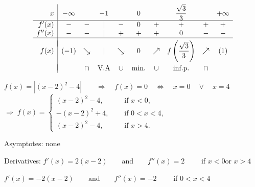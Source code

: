 \begin{Answer}
    		 \[ \begin{array}{r|ccccccccc}
                x & -\infty & & -1 & & 0 & & \dfrac{\sqrt{3}}{3} &  & +\infty \\
                \hline
                f'(x)   & - & - & | & - & 0 & + & + & + & + \\
                f''(x)  & - & - & | & + & + & + & 0 & - & -\\
                \hline
                &&&&&\vspace{-0.3cm}\\
                f(x)    & (-1) & \searrow & | & \searrow & 0 & \nearrow & f\left(\dfrac{\sqrt{3}}{3} \right) & \nearrow & (1)\\
                &&&&&\vspace{-0.3cm}\\                                                                              
                        & & \cap  & \mbox{V.A} & \cup & \mbox{min.} & \cup & \mbox{inf.p.} & \cap \\
                \end{array}\]
    		
    	\Question $f(x) = \left| (x-2)^2-4 \right| 
    		\qquad \Rightarrow \quad  f(x)=0 \quad \Leftrightarrow \quad x=0 \quad \vee \quad x=4$ \\[0.2cm]
    		$\Rightarrow \; f(x)= \left\{ \begin{array}{ll} (x-2)^2-4, & \quad \text{ if }  x <0, \\
    		-(x-2)^2+4, & \quad \text{ if } 0 < x < 4,\\
    		(x-2)^2-4, & \quad \text{ if }  x > 4. \end{array} \right.$ \\[0.2cm]
    		\item [] Asymptotes: \quad none\par
    		Derivatives: \quad $f'(x) = 2(x-2)\qquad\mbox{and}\qquad f''(x)=2 \qquad $ if \;  $x<0$\quad or \quad $x>4$ \par
    		\hspace{2.35cm} $f'(x) = -2(x-2)\qquad\mbox{and}\qquad f''(x)=-2 \qquad $ if \;  $0<x<4$
    		

\end{Answer}
